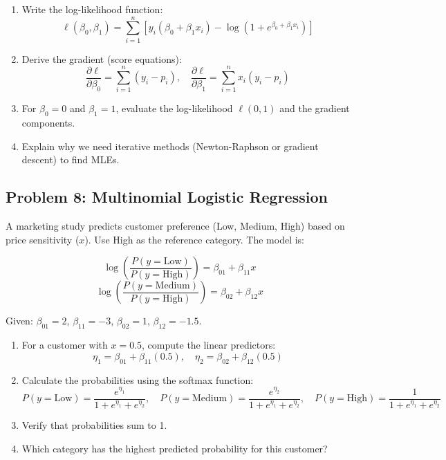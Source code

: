 \documentclass[12pt]{article}
\begin{document}
\begin{enumerate}[label=(\alph*)]
\item Write the log-likelihood function:
\[
\ell(\beta_0, \beta_1) = \sum_{i=1}^{n} \left[y_i(\beta_0 + \beta_1 x_i) - \log(1 + e^{\beta_0 + \beta_1 x_i})\right]
\]

\item Derive the gradient (score equations):
\[
\frac{\partial \ell}{\partial \beta_0} = \sum_{i=1}^{n}(y_i - p_i), \quad \frac{\partial \ell}{\partial \beta_1} = \sum_{i=1}^{n}x_i(y_i - p_i)
\]

\item For \(\beta_0 = 0\) and \(\beta_1 = 1\), evaluate the log-likelihood \(\ell(0, 1)\) and the gradient components.

\item Explain why we need iterative methods (Newton-Raphson or gradient descent) to find MLEs.
\end{enumerate}

\subsection*{Problem 8: Multinomial Logistic Regression}

A marketing study predicts customer preference (Low, Medium, High) based on price sensitivity (\(x\)). Use High as the reference category. The model is:

\[
\log\left(\frac{P(y = \text{Low})}{P(y = \text{High})}\right) = \beta_{01} + \beta_{11}x
\]
\[
\log\left(\frac{P(y = \text{Medium})}{P(y = \text{High})}\right) = \beta_{02} + \beta_{12}x
\]

Given: \(\beta_{01} = 2\), \(\beta_{11} = -3\), \(\beta_{02} = 1\), \(\beta_{12} = -1.5\).

\begin{enumerate}[label=(\alph*)]
\item For a customer with \(x = 0.5\), compute the linear predictors:
\[
\eta_1 = \beta_{01} + \beta_{11}(0.5), \quad \eta_2 = \beta_{02} + \beta_{12}(0.5)
\]

\item Calculate the probabilities using the softmax function:
\[
P(y = \text{Low}) = \frac{e^{\eta_1}}{1 + e^{\eta_1} + e^{\eta_2}}, \quad P(y = \text{Medium}) = \frac{e^{\eta_2}}{1 + e^{\eta_1} + e^{\eta_2}}, \quad P(y = \text{High}) = \frac{1}{1 + e^{\eta_1} + e^{\eta_2}}
\]

\item Verify that probabilities sum to 1.

\item Which category has the highest predicted probability for this customer?
\end{enumerate}
\end{document}
